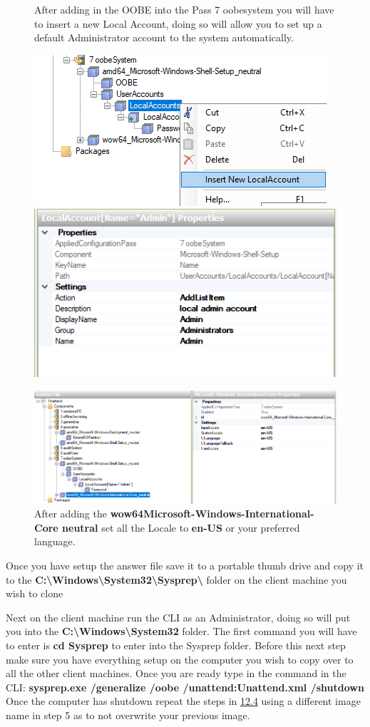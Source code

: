 \documentclass{article}
\begin{document}
\begin{figure}[h]
	After adding in the OOBE into the Pass 7 oobesystem you will have to insert a new Local Account, doing so will allow you to set up a default Administrator account to the system automatically.
	
	\includegraphics[width=0.5\linewidth]{"sysprep/3-23-2018 13-36-14"}
	\includegraphics[width=0.5\linewidth]{"sysprep/3-23-2018 13-36-26"}
\end{figure}
\begin{figure}[h]
	\centering
	\includegraphics[width=1\linewidth]{"sysprep/3-23-2018 13-35-25"}
	After adding the \textbf{wow64\textunderscore Microsoft-Windows-International-Core neutral} set all the Locale to \textbf{en-US} or your preferred language.
\end{figure}
\newpage
Once you have setup the answer file save it to a portable thumb drive and copy it to the \textbf{C:\textbackslash Windows\textbackslash System32\textbackslash Sysprep\textbackslash} folder on the client machine you wish to clone
\newline

Next on the client machine run the CLI as an Administrator, doing so will put you into the \textbf{C:\textbackslash Windows\textbackslash System32} folder. The first command you will have to enter is \textbf{cd Sysprep} to enter into the Sysprep folder. Before this next step make sure you have everything setup on the computer you wish to copy over to all the other client machines. Once you are ready type in the command in the CLI:
\newline
\textbf{sysprep.exe /generalize /oobe /unattend:Unattend.xml /shutdown}
\newline
Once the computer has shutdown repeat the steps in \hyperref[sec:12.4]{12.4} using a different image name in step 5 as to not overwrite your previous image.
\newpage
\end{document}
